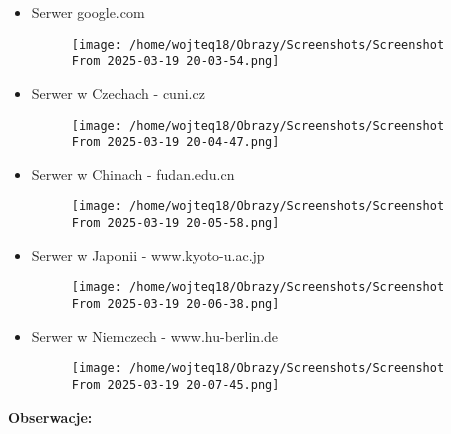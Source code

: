 \documentclass[12pt]{article}
\begin{document}
\begin{itemize}
  \item Serwer google.com
    \begin{figure}[H]
      \centering
      \texttt{[image: /home/wojteq18/Obrazy/Screenshots/Screenshot From 2025-03-19 20-03-54.png]}
      \label{fig:large_google}
    \end{figure}

  \item Serwer w Czechach - cuni.cz
    \begin{figure}[H]
      \centering
      \texttt{[image: /home/wojteq18/Obrazy/Screenshots/Screenshot From 2025-03-19 20-04-47.png]}
      \label{fig:large_cuni}
    \end{figure}

  \item Serwer w Chinach - fudan.edu.cn
    \begin{figure}[H]
      \centering
      \texttt{[image: /home/wojteq18/Obrazy/Screenshots/Screenshot From 2025-03-19 20-05-58.png]}
      \label{fig:large_fudan}
    \end{figure}

  \item Serwer w Japonii - www.kyoto-u.ac.jp
    \begin{figure}[H]
      \centering
      \texttt{[image: /home/wojteq18/Obrazy/Screenshots/Screenshot From 2025-03-19 20-06-38.png]}
      \label{fig:large_kyoto}
    \end{figure}

  \item Serwer w Niemczech - www.hu-berlin.de
    \begin{figure}[H]
      \centering
      \texttt{[image: /home/wojteq18/Obrazy/Screenshots/Screenshot From 2025-03-19 20-07-45.png]}
      \label{fig:large_hu_berlin}
    \end{figure}
\end{itemize}

\vspace{1\baselineskip}
\textbf{Obserwacje:}
\end{document}
